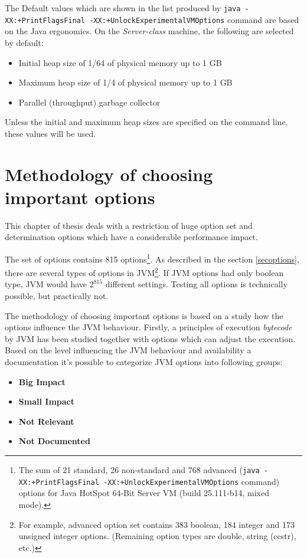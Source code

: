 \documentclass[
  digital, %
  oneside,
  notable, %
  nolof,     %
  nolot     %
]{fithesis3}
\begin{document}
The Default values which are shown in the list produced by \texttt{java -XX:+PrintFlagsFinal -XX:+UnlockExperimentalVMOptions} command are based on the Java ergonomics. On the \textit{Server-class} machine, the following are selected by default:
\begin{itemize}
	\item Initial heap size of 1/64 of physical memory up to 1 GB
	\item Maximum heap size of 1/4 of physical memory up to 1 GB
	\item Parallel (throughput) garbage collector
\end{itemize}
Unless the initial and maximum heap sizes are specified on the command line, these values will be used. \cite{ergonomics}


\chapter{Methodology of choosing important options}
This chapter of thesis deals with a restriction of huge option set and determination options which have a considerable performance impact.

The set of options contains 815 options\footnote{The sum of 21 standard, 26 non-standard and 768 advanced (\texttt{java -XX:+PrintFlagsFinal -XX:+UnlockExperimentalVMOptions} command) options for Java HotSpot\texttrademark{} 64-Bit Server VM (build 25.111-b14, mixed mode).}. As described in the section \ref{secoptions}, there are several types of options in JVM\footnote{For example, advanced option set contains 383 boolean, 184 integer and 173 unsigned integer options. (Remaining option types are double, string (ccstr), etc.)}. If JVM options had only boolean type, JVM would have $2^{815}$ different settings. Testing all options is technically possible, but practically not.


The methodology of choosing important options is based on a study how the options influence the JVM behaviour. Firstly, a principles of execution \textit{bytecode} by JVM has been studied together with options which can adjust the execution. Based on the level influencing the JVM behaviour and availability a documentation it's possible to categorize JVM options into following groups:
\begin{itemize}
	\item \textbf{Big Impact}
	\item \textbf{Small Impact}
	\item \textbf{Not Relevant}
	\item \textbf{Not Documented}
\end{itemize}
\end{document}
